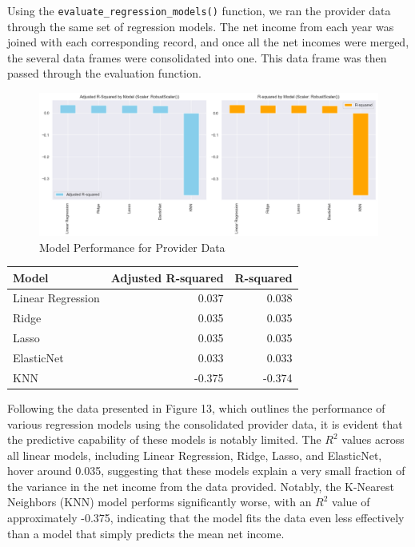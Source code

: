 \documentclass{article}
\theoremstyle{mytheoremstyle}
\theoremstyle{mytheoremstyle}
\theoremstyle{myproblemstyle}
\begin{document}
Using the \texttt{evaluate\_regression\_models()} function, we ran the provider data through the same set of regression models. The net income from each year was joined with each corresponding record, and once all the net incomes were merged, the several data frames were consolidated into one. This data frame was then passed through the evaluation function. 

\begin{figure}[htbp]
\centering
\includegraphics[width=\linewidth]{Images/evalRegModelProviders.png}
\caption{Model Performance for Provider Data}
\label{fig:Robust Scaler Results}
\end{figure}

\begin{table}[ht]
\centering
\begin{tabular}{@{}lrr@{}}
\toprule
Model            & \multicolumn{1}{c}{Adjusted R-squared} & \multicolumn{1}{c}{R-squared} \\ 
\midrule
Linear Regression & 0.037 & 0.038\\
Ridge             & 0.035 & 0.035\\
Lasso             & 0.035 & 0.035\\
ElasticNet        & 0.033 & 0.033\\
KNN               & -0.375 & -0.374\\
\bottomrule
\end{tabular}
\label{tab:model_performance robust}
\end{table}

Following the data presented in Figure 13, which outlines the performance of various regression models using the consolidated provider data, it is evident that the predictive capability of these models is notably limited. The $R^2$ values across all linear models, including Linear Regression, Ridge, Lasso, and ElasticNet, hover around 0.035, suggesting that these models explain a very small fraction of the variance in the net income from the data provided. Notably, the K-Nearest Neighbors (KNN) model performs significantly worse, with an $R^2$ value of approximately -0.375, indicating that the model fits the data even less effectively than a model that simply predicts the mean net income.
\end{document}
